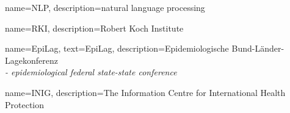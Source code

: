 \RequirePackage[square]{natbib}




\RequirePackage{amsthm}
\theoremstyle{definition}
\newtheorem{definition}{Definition}[chapter]
\newtheorem{example}{Example}[chapter]




\RequirePackage[small,bf]{caption}




\RequirePackage{subfig}





\graphicspath{{./Figures/}}









{
  name={NLP},
  description={natural language processing}
}

{
  name={RKI},
  description={Robert Koch Institute}
}

{
  name={EpiLag},
  text={EpiLag},
  description={Epidemiologische Bund-L\"ander-Lagekonferenz \\
               \textit{- epidemiological federal state-state conference}}
}

{
  name={INIG},
  description={The Information Centre for International Health Protection}
}

